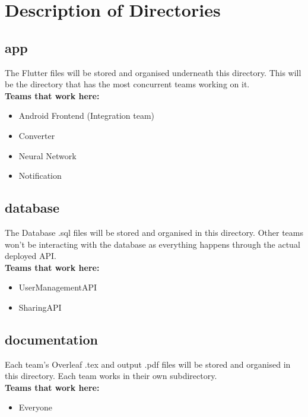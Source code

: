 \documentclass{article}
\begin{document}
\newpage

\section{Description of Directories}
\subsection{app}
The Flutter files will be stored and organised underneath this directory. This will be the directory that has the most concurrent teams working on it.\\
\newline
\textbf{Teams that work here:}
\begin{itemize}
    \item Android Frontend (Integration team)
    \item Converter
    \item Neural Network
    \item Notification
\end{itemize}

\subsection{database}
The Database .sql files will be stored and organised in this directory. Other teams won't be interacting with the database as everything happens through the actual deployed API. \\
\newline
\textbf{Teams that work here:}
\begin{itemize}
    \item UserManagementAPI
    \item SharingAPI
\end{itemize}

\subsection{documentation}
Each team's Overleaf .tex and output .pdf files will be stored and organised in this directory. Each team works in their own subdirectory. \\
\newline
\textbf{Teams that work here:}
\begin{itemize}
    \item Everyone
\end{itemize}

\newpage
\end{document}
